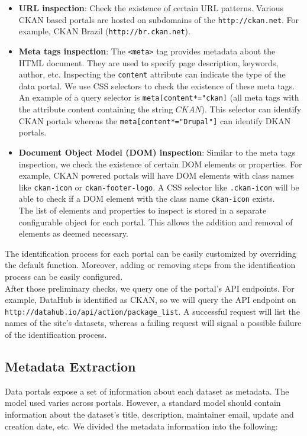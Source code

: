 \documentclass{sig-alternate}
\begin{document}
\begin{itemize}
  \item \textbf{URL inspection}: Check the existence of certain URL patterns. Various CKAN based portals are hosted on subdomains of the \texttt{http://ckan.net}. For example, CKAN Brazil (\texttt{http://br.ckan.net}).
  \item \textbf{Meta tags inspection}: The \texttt{<meta>} tag provides metadata about the HTML document. They are used to specify page description, keywords, author, etc. Inspecting the \texttt{content} attribute can indicate the type of the data portal. We use CSS selectors to check the existence of these meta tags. An example of a query selector is \texttt{meta[content*="ckan]} (all meta tags with the attribute content containing the string $CKAN$). This selector can identify CKAN portals whereas the \texttt{meta[content*="Drupal"]} can identify DKAN portals.
  \item \textbf{Document Object Model (DOM) inspection}: Similar to the meta tags inspection, we check the existence of certain DOM elements or properties. For example, CKAN powered portals will have DOM elements with class names like \texttt{ckan-icon} or \texttt{ckan-footer-logo}. A CSS selector like \texttt{.ckan-icon} will be able to check if a DOM element with the class name \texttt{ckan-icon} exists.\\
  The list of elements and properties to inspect is stored in a separate configurable object for each portal. This allows the addition and removal of elements as deemed necessary.
\end{itemize}

The identification process for each portal can be easily customized by overriding the default function. Moreover, adding or removing steps from the identification process can be easily configured.\\
After those preliminary checks, we query one of the portal's API endpoints. For example, DataHub is identified as CKAN, so we will query the API endpoint on \texttt{http://datahub.\-io/api/action/package\_list}. A successful request will list the names of the site's datasets, whereas a failing request will signal a possible failure of the identification process.

\subsection{Metadata Extraction}

Data portals expose a set of information about each dataset as metadata. The model used varies across portals. However, a standard model should contain information about the dataset's title, description, maintainer email, update and creation date, etc. We divided the metadata information into the following:
\end{document}
